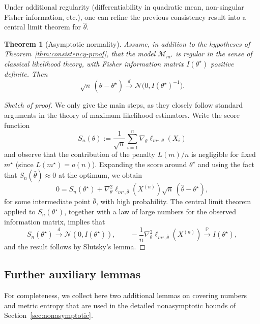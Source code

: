 \documentclass[12pt]{article}
\newtheorem{theorem}{Theorem}[section]
\numberwithin{equation}{section}
\begin{document}
	Under additional regularity (differentiability in quadratic mean,
	non-singular Fisher information, etc.), one can refine the previous
	consistency result into a central limit theorem for $\widehat{\theta}$.
	
	\begin{theorem}[Asymptotic normality]
		\label{thm:asymp-normal-proof}
		Assume, in addition to the hypotheses of Theorem~\ref{thm:consistency-proof},
		that the model $\mathcal{M}_{m^{\star}}$ is regular in the sense of
		classical likelihood theory, with Fisher information matrix
		$I(\theta^{\star})$ positive definite.  Then
		\begin{equation}
			\sqrt{n}\,(\widehat{\theta}-\theta^{\star})
			\xrightarrow{d}
			\mathcal{N}\big(0, I(\theta^{\star})^{-1}\big).
		\end{equation}
	\end{theorem}
	
	\begin{proof}[Sketch of proof]
		We only give the main steps, as they closely follow
		standard arguments in the theory of maximum likelihood estimators.
		Write the score function
		\[
		S_n(\theta)
		:= \frac{1}{\sqrt{n}}
		\sum_{i=1}^n \nabla_{\theta}\ell_{m^{\star},\theta}(X_i)
		\]
		and observe that the contribution of the penalty $L(m)/n$ is negligible
		for fixed $m^{\star}$ (since $L(m^{\star})=o(n)$).
		Expanding the score around $\theta^{\star}$ and using the fact that
		$S_n(\widehat{\theta})\approx 0$ at the optimum, we obtain
		\[
		0
		= S_n(\theta^{\star})
		+ \nabla_{\theta}^2\ell_{m^{\star},\bar{\theta}}(X^{(n)})
		\sqrt{n}\,(\widehat{\theta}-\theta^{\star}),
		\]
		for some intermediate point $\bar{\theta}$, with high probability.
		The central limit theorem applied to $S_n(\theta^{\star})$, together
		with a law of large numbers for the observed information matrix,
		implies that
		\[
		S_n(\theta^{\star})
		\xrightarrow{d} \mathcal{N}(0,I(\theta^{\star})),\qquad
		-\frac{1}{n}
		\nabla_{\theta}^2\ell_{m^{\star},\bar{\theta}}(X^{(n)})
		\xrightarrow{\mathbb{P}} I(\theta^{\star}),
		\]
		and the result follows by Slutsky's lemma.
	\end{proof}
	
	\subsection{Further auxiliary lemmas}
	
	For completeness, we collect here two additional lemmas on covering
	numbers and metric entropy that are used in the detailed nonasymptotic
	bounds of Section~\ref{sec:nonasymptotic}.
	
\end{document}
